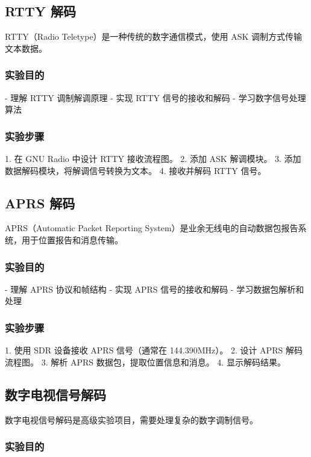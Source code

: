 \documentclass[UTF8]{ctexbook}
\begin{document}
\subsection{RTTY 解码}

RTTY（Radio Teletype）是一种传统的数字通信模式，使用 ASK 调制方式传输文本数据。

\subsubsection{实验目的}

- 理解 RTTY 调制解调原理
- 实现 RTTY 信号的接收和解码
- 学习数字信号处理算法

\subsubsection{实验步骤}

1. 在 GNU Radio 中设计 RTTY 接收流程图。
2. 添加 ASK 解调模块。
3. 添加数据解码模块，将解调信号转换为文本。
4. 接收并解码 RTTY 信号。

\subsection{APRS 解码}

APRS（Automatic Packet Reporting System）是业余无线电的自动数据包报告系统，用于位置报告和消息传输。

\subsubsection{实验目的}

- 理解 APRS 协议和帧结构
- 实现 APRS 信号的接收和解码
- 学习数据包解析和处理

\subsubsection{实验步骤}

1. 使用 SDR 设备接收 APRS 信号（通常在 144.390MHz）。
2. 设计 APRS 解码流程图。
3. 解析 APRS 数据包，提取位置信息和消息。
4. 显示解码结果。

\subsection{数字电视信号解码}

数字电视信号解码是高级实验项目，需要处理复杂的数字调制信号。

\subsubsection{实验目的}
\end{document}
